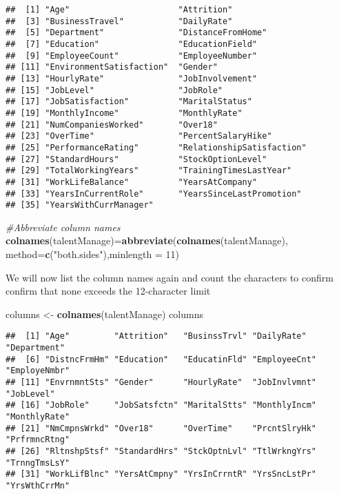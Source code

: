 \documentclass[]{article}
\newenvironment{Shaded}{\begin{snugshade}}{\end{snugshade}}
\newcommand{\KeywordTok}[1]{\textcolor[rgb]{0.13,0.29,0.53}{\textbf{{#1}}}}
\newcommand{\DataTypeTok}[1]{\textcolor[rgb]{0.13,0.29,0.53}{{#1}}}
\newcommand{\DecValTok}[1]{\textcolor[rgb]{0.00,0.00,0.81}{{#1}}}
\newcommand{\StringTok}[1]{\textcolor[rgb]{0.31,0.60,0.02}{{#1}}}
\newcommand{\CommentTok}[1]{\textcolor[rgb]{0.56,0.35,0.01}{\textit{{#1}}}}
\newcommand{\NormalTok}[1]{{#1}}
\begin{document}
\begin{verbatim}
##  [1] "Age"                      "Attrition"               
##  [3] "BusinessTravel"           "DailyRate"               
##  [5] "Department"               "DistanceFromHome"        
##  [7] "Education"                "EducationField"          
##  [9] "EmployeeCount"            "EmployeeNumber"          
## [11] "EnvironmentSatisfaction"  "Gender"                  
## [13] "HourlyRate"               "JobInvolvement"          
## [15] "JobLevel"                 "JobRole"                 
## [17] "JobSatisfaction"          "MaritalStatus"           
## [19] "MonthlyIncome"            "MonthlyRate"             
## [21] "NumCompaniesWorked"       "Over18"                  
## [23] "OverTime"                 "PercentSalaryHike"       
## [25] "PerformanceRating"        "RelationshipSatisfaction"
## [27] "StandardHours"            "StockOptionLevel"        
## [29] "TotalWorkingYears"        "TrainingTimesLastYear"   
## [31] "WorkLifeBalance"          "YearsAtCompany"          
## [33] "YearsInCurrentRole"       "YearsSinceLastPromotion" 
## [35] "YearsWithCurrManager"
\end{verbatim}

\begin{Shaded}
\begin{Highlighting}[]
\CommentTok{#Abbreviate column names}
\KeywordTok{colnames}\NormalTok{(talentManage)=}\KeywordTok{abbreviate}\NormalTok{(}\KeywordTok{colnames}\NormalTok{(talentManage), }\DataTypeTok{method=}\KeywordTok{c}\NormalTok{(}\StringTok{"both.sides"}\NormalTok{),}\DataTypeTok{minlength =} \DecValTok{11}\NormalTok{)}
\end{Highlighting}
\end{Shaded}

We will now list the column names again and count the characters to
confirm confirm that none exceeds the 12-character limit

\begin{Shaded}
\begin{Highlighting}[]
\NormalTok{columns <-}\StringTok{ }\KeywordTok{colnames}\NormalTok{(talentManage)}
\NormalTok{columns}
\end{Highlighting}
\end{Shaded}

\begin{verbatim}
##  [1] "Age"         "Attrition"   "BusinssTrvl" "DailyRate"   "Department" 
##  [6] "DistncFrmHm" "Education"   "EducatinFld" "EmployeeCnt" "EmployeNmbr"
## [11] "EnvrnmntSts" "Gender"      "HourlyRate"  "JobInvlvmnt" "JobLevel"   
## [16] "JobRole"     "JobSatsfctn" "MaritalStts" "MonthlyIncm" "MonthlyRate"
## [21] "NmCmpnsWrkd" "Over18"      "OverTime"    "PrcntSlryHk" "PrfrmncRtng"
## [26] "RltnshpStsf" "StandardHrs" "StckOptnLvl" "TtlWrkngYrs" "TrnngTmsLsY"
## [31] "WorkLifBlnc" "YersAtCmpny" "YrsInCrrntR" "YrsSncLstPr" "YrsWthCrrMn"
\end{verbatim}
\end{document}
